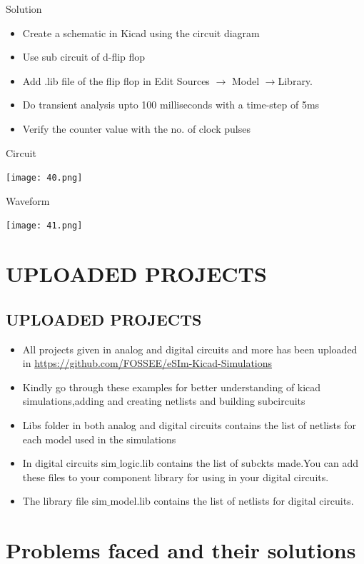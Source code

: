 \documentclass[12pt,a4paper]{  report}
\begin{document}
Solution
\begin{itemize}
\item Create a schematic in Kicad using the circuit diagram
\item Use sub circuit of d-flip flop
\item Add .lib file of the flip flop in Edit Sources $\rightarrow$ Model $\rightarrow$Library.
\item Do transient analysis upto 100 milliseconds with a time-step of 5ms
\item Verify the counter value with the no. of clock pulses
\end{itemize}

Circuit
\begin{flushleft}
\texttt{[image: 40.png]}
\end{flushleft}

Waveform
\begin{flushleft}
\texttt{[image: 41.png]}
\end{flushleft}
\newpage

\chapter{\textbf{UPLOADED PROJECTS}}
\section{UPLOADED PROJECTS}
\begin{itemize}
\item All projects given in analog and digital circuits and more has been uploaded in \url{https://github.com/FOSSEE/eSIm-Kicad-Simulations}
\item Kindly go through these examples for better understanding of kicad simulations,adding and creating netlists and building subcircuits
\item Libs folder in both analog and digital circuits contains the list of netlists for each model used in the simulations
\item In digital circuits sim$\_$logic.lib contains the list of subckts made.You can add these files to your component library for using in your digital circuits.
\item The library file sim$\_$model.lib contains the list of netlists for digital circuits.
\end{itemize}
\chapter{\textbf{Problems faced and their solutions}}
\end{document}
